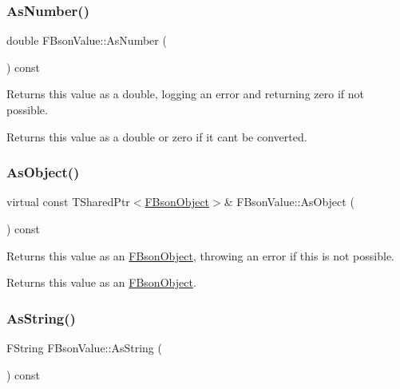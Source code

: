 \subsubsection{\texorpdfstring{As\+Number()}{AsNumber()}}
{\footnotesize\ttfamily double F\+Bson\+Value\+::\+As\+Number (\begin{DoxyParamCaption}{ }\end{DoxyParamCaption}) const}

Returns this value as a double, logging an error and returning zero if not possible.

\begin{DoxyReturn}{Returns}
this value as a double or zero if it cant be converted. 
\end{DoxyReturn}
\mbox{\label{class_f_bson_value_a183af604be243a610b576dd7de32d334}} 
\subsubsection{\texorpdfstring{As\+Object()}{AsObject()}}
{\footnotesize\ttfamily virtual const T\+Shared\+Ptr$<$\mbox{\hyperlink{class_f_bson_object}{F\+Bson\+Object}}$>$\& F\+Bson\+Value\+::\+As\+Object (\begin{DoxyParamCaption}{ }\end{DoxyParamCaption}) const\hspace{0.3cm}{\ttfamily [virtual]}}

Returns this value as an \mbox{\hyperlink{class_f_bson_object}{F\+Bson\+Object}}, throwing an error if this is not possible.

\begin{DoxyReturn}{Returns}
this value as an \mbox{\hyperlink{class_f_bson_object}{F\+Bson\+Object}}. 
\end{DoxyReturn}
\mbox{\label{class_f_bson_value_aee42d2615ae788bd7374752b1c3a097d}} 
\subsubsection{\texorpdfstring{As\+String()}{AsString()}}
{\footnotesize\ttfamily F\+String F\+Bson\+Value\+::\+As\+String (\begin{DoxyParamCaption}{ }\end{DoxyParamCaption}) const}

